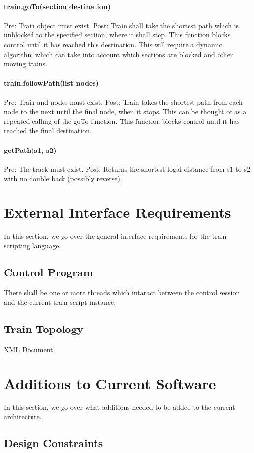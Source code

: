\documentclass[a4paper,11pt,notitlepage]{article}
\begin{document}
\paragraph{train.goTo(section destination)} Pre: Train object must exist. Post: Train shall take the shortest path which is unblocked to the specified section, where it shall stop. This function blocks control until it has reached this destination. This will require a dynamic algorithm which can take into account which sections are blocked and other moving trains.
\paragraph{train.followPath(list nodes)} Pre: Train and nodes must exist. Post: Train takes the shortest path from each node to the next until the final node, when it stops. This can be thought of as a repeated calling of the goTo function. This function blocks control until it has reached the final destination.
\paragraph{getPath(s1, s2)} Pre: The track must exist.  Post: Returns the shortest logal distance from s1 to s2 with no double back (possibly reverse).

\newpage
\section{External Interface Requirements}
    In this section, we go over the general interface requirements for the train scripting language.
\subsection{Control Program}
    There shall be one or more threads which intaract between the control session and the current train script instance.
\subsection{Train Topology}
    XML Document.

\newpage
\section{Additions to Current Software}
    In this section, we go over what additions needed to be added to the current architecture.
\subsection{Design Constraints}
\end{document}
